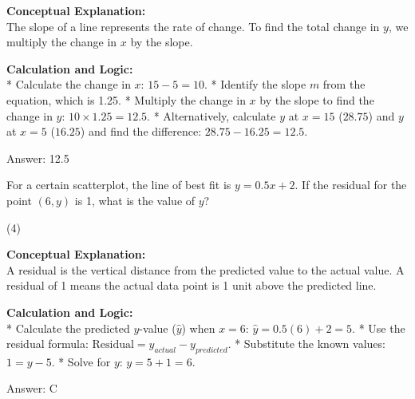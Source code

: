\documentclass[11pt,paper=a4,answers]{exam}
\begin{document}
\begin{questions}
\begin{solution}
\textbf{Conceptual Explanation:} \\
The slope of a line represents the rate of change. To find the total change in $y$, we multiply the change in $x$ by the slope.

\vspace{30pt}

\textbf{Calculation and Logic:} \\
* Calculate the change in $x$: $15 - 5 = 10$.
* Identify the slope $m$ from the equation, which is 1.25.
* Multiply the change in $x$ by the slope to find the change in $y$: $10 \times 1.25 = 12.5$.
* Alternatively, calculate $y$ at $x=15$ ($28.75$) and $y$ at $x=5$ ($16.25$) and find the difference: $28.75 - 16.25 = 12.5$.

\vspace{30pt}

Answer: \colorbox{yellow!100}{12.5}
\end{solution}

\vspace{60pt}

\question
For a certain scatterplot, the line of best fit is $y = 0.5x + 2$. If the residual for the point $(6, y)$ is 1, what is the value of $y$?
\begin{tasks}(4)
\end{tasks}

\begin{solution}
\textbf{Conceptual Explanation:} \\
A residual is the vertical distance from the predicted value to the actual value. A residual of 1 means the actual data point is 1 unit above the predicted line.

\vspace{30pt}

\textbf{Calculation and Logic:} \\
* Calculate the predicted $y$-value ($\hat{y}$) when $x = 6$: $\hat{y} = 0.5(6) + 2 = 5$.
* Use the residual formula: $\text{Residual} = y_{actual} - y_{predicted}$.
* Substitute the known values: $1 = y - 5$.
* Solve for $y$: $y = 5 + 1 = 6$.

\vspace{30pt}

Answer: \colorbox{yellow!100}{C}
\end{solution}

\vspace{60pt}


\end{questions}
\end{document}
